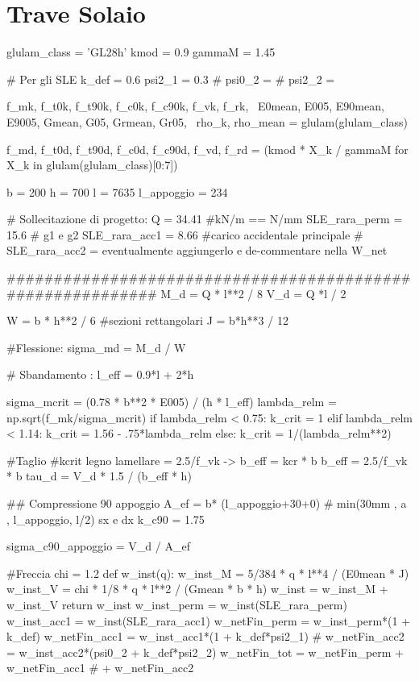 \section{Trave Solaio}
\begin{pycode}[TraveSolaio]
glulam_class = 'GL28h'
kmod = 0.9
gammaM = 1.45

# Per gli SLE
k_def = 0.6
psi2_1 = 0.3
# psi0_2 =
# psi2_2 =

f_mk, f_t0k, f_t90k, f_c0k, f_c90k, f_vk, f_rk, \
E0mean, E005, E90mean, E9005, Gmean, G05, Grmean, Gr05, \
rho_k, rho_mean = glulam(glulam_class)

f_md, f_t0d, f_t90d, f_c0d, f_c90d, f_vd, f_rd = (kmod * X_k / gammaM for X_k in glulam(glulam_class)[0:7])

b = 200
h = 700
l = 7635
l_appoggio = 234 

# Sollecitazione di progetto:
Q = 34.41 #kN/m == N/mm
SLE_rara_perm = 15.6 # g1 e g2
SLE_rara_acc1 = 8.66 #carico accidentale principale
# SLE_rara_acc2 =  eventualmente aggiungerlo e de-commentare nella W_net

###########################################################
M_d = Q * l**2 / 8
V_d = Q *l / 2

W = b * h**2 / 6 #sezioni rettangolari
J = b*h**3 / 12

#Flessione:
sigma_md = M_d / W

# Sbandamento :
l_eff = 0.9*l + 2*h 

sigma_mcrit = (0.78 * b**2 * E005) / (h * l_eff) 
lambda_relm = np.sqrt(f_mk/sigma_mcrit)
if lambda_relm < 0.75:
    k_crit = 1
elif lambda_relm < 1.14:
    k_crit = 1.56 - .75*lambda_relm
else:
    k_crit = 1/(lambda_relm**2)


#Taglio    
#kcrit legno lamellare = 2.5/f_vk -> b_eff = kcr * b
b_eff = 2.5/f_vk * b
tau_d = V_d * 1.5 / (b_eff * h)

## Compressione 90 appoggio
A_ef = b* (l_appoggio+30+0) # min(30mm , a , l_appoggio, l/2) sx e dx
k_c90 = 1.75

sigma_c90_appoggio = V_d / A_ef

#Freccia
chi = 1.2
def w_inst(q): 
    w_inst_M = 5/384 * q * l**4 / (E0mean * J)
    w_inst_V = chi * 1/8 * q * l**2 / (Gmean * b * h)
    w_inst = w_inst_M + w_inst_V
    return w_inst
w_inst_perm = w_inst(SLE_rara_perm)
w_inst_acc1 = w_inst(SLE_rara_acc1)
w_netFin_perm = w_inst_perm*(1 + k_def)
w_netFin_acc1 = w_inst_acc1*(1 + k_def*psi2_1)
# w_netFin_acc2 = w_inst_acc2*(psi0_2 + k_def*psi2_2)
w_netFin_tot = w_netFin_perm + w_netFin_acc1 # + w_netFin_acc2

\end{pycode}

